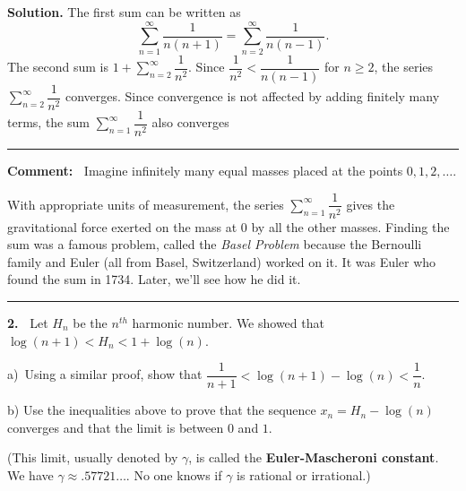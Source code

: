 \documentclass[12pt]{article}
\theoremstyle{definition}
\theoremstyle{remark}
\theoremstyle{definition}
\newenvironment{Solution}{\noindent\textbf{Solution.}}{}
\begin{document}
\begin{Solution} The first sum can be written as 
\[\sum\limits_{n=1}^\infty\dfrac{1}{n(n+1)}=
\sum\limits_{n=2}^\infty\dfrac{1}{n(n-1)}.
\]
The second sum is $1+\sum\limits_{n=2}^\infty\dfrac{1}{n^2}$. Since 
$\dfrac{1}{n^2}<\dfrac{1}{n(n-1)}$ for $n\geq 2$, the series 
$\sum\limits_{n=2}^\infty\dfrac{1}{n^2}$ converges. Since convergence is not affected by adding finitely many terms, the sum $\sum\limits_{n=1}^\infty\dfrac{1}{n^2}$ also converges

\end{Solution}

\rule{\textwidth}{1pt}\newline
{\bf Comment:\ } Imagine infinitely many equal masses placed at the points $0,1,2,\dots$. 
\begin{center}
 \end{center}
With appropriate units of measurement, the series $\sum\limits_{n=1}^\infty\dfrac{1}{n^2}$  gives the gravitational force exerted on the mass at $0$ by all the other masses. Finding the sum was a famous problem, called the {\it Basel Problem} because  the Bernoulli family and Euler (all from Basel, Switzerland) worked on it. It was Euler who found the sum in 1734. Later, we'll see how he did it. 
\newline
\rule{\textwidth}{1pt}

{\bf 2.\ } Let $H_n$ be the $n^{th}$ harmonic number. We showed that 
$\log(n+1)<H_n<1+\log(n)$. 

a)\ Using a similar proof, show that 
$\dfrac{1}{n+1}<\log(n+1)-\log (n)<\dfrac{1}{n}$. 

b) Use the inequalities above to prove that the sequence $x_n=H_n-\log(n)$ converges and that the limit is between $0$ and $1$. 

(This limit, usually denoted by $\gamma$,  is called the {\bf Euler-Mascheroni constant}. We have $\gamma\approx .57721\dots$. No one knows if $\gamma$ is rational or irrational.) 
\end{document}
